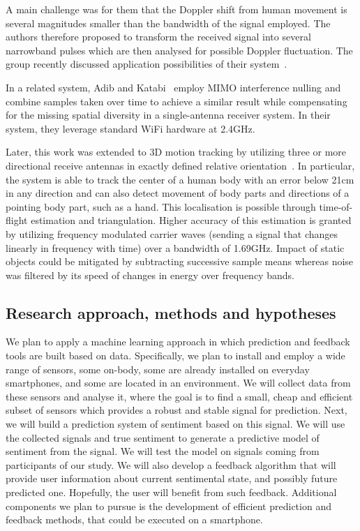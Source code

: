 \documentclass[12pt]{article}
\begin{document}
A main challenge was for them that the Doppler shift from human movement is several magnitudes smaller than the bandwidth of the signal employed.
The authors therefore proposed to transform the received signal into several narrowband pulses which are then analysed for possible Doppler fluctuation.
The group recently discussed application possibilities of their system~\cite{RFSensing_Kellog_2014}.

In a related system, Adib and Katabi~\cite{Pervasive_Adib_2013} employ MIMO interference nulling and combine samples taken over time to achieve a similar result while compensating for the missing spatial diversity in a single-antenna receiver system.
In their system, they leverage standard WiFi hardware at 2.4GHz.

Later, this work was extended to 3D motion tracking by utilizing three or more directional receive antennas in exactly defined relative orientation~\cite{RFSensing_Adib_2014}. 
In particular, the system is able to track the center of a human body with an error below 21cm in any direction and can also detect movement of body parts and directions of a pointing body part, such as a hand. 
This localisation is possible through time-of-flight estimation and triangulation.
Higher accuracy of this estimation is granted by utilizing frequency modulated carrier waves (sending a signal that changes linearly in frequency with time) over a bandwidth of 1.69GHz.
Impact of static objects could be mitigated by subtracting successive sample means whereas noise was filtered by its speed of changes in energy over frequency bands. 

\subsection*{Research approach, methods and hypotheses}
We plan to apply a machine learning approach in which prediction and feedback tools are built based on data. Specifically, we plan to install and employ a wide range of sensors, some on-body, some are already installed on everyday smartphones, and some are located in an environment. 
We will collect data from these sensors and analyse it, where the goal is to find a small, cheap and efficient subset of sensors which provides a robust and stable signal for prediction. Next, we will build a prediction system of sentiment based on this signal. We will use the collected signals and true sentiment to generate a predictive model of sentiment from the signal.
We will test the model on signals coming from participants of our study. We will also develop a feedback algorithm that will provide user information about current sentimental state, and possibly future predicted one. Hopefully, the user will benefit from such feedback. Additional components we plan to pursue is the development of efficient prediction and feedback methods, that could be executed on a smartphone.
\end{document}
